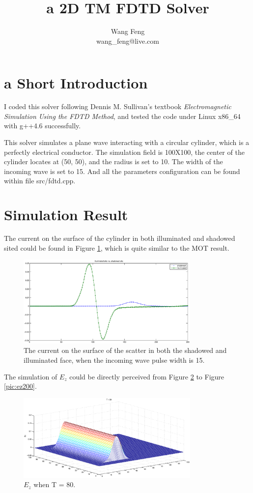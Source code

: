 \documentclass[9pt,a4paper]{article}
\author{Wang Feng \\ wang\_feng@live.com}
\title{a 2D TM FDTD Solver}
\begin{document}
\maketitle

\section{a Short Introduction}

I coded this solver following Dennis M. Sullivan's textbook \textit{Electromagnetic Simulation Using the FDTD Method}, 
and tested the code under Linux x86\_64 with g++4.6 successfully. 

This solver simulates a plane wave interacting with a circular cylinder, which is a perfectly electrical conductor.   
The simulation field is 100X100, the center of the cylinder locates at (50, 50), and the radius is set to 10. 
The width of the incoming wave is set to 15. And all the parameters configuration can be found within file src/fdtd.cpp.

\section{Simulation Result}

The current on the surface of the cylinder in both illuminated and shadowed sited could be found in Figure \ref{pic:vs}, which is quite
similar to the MOT result.


\begin{figure}
\centering
\includegraphics[angle=270,
    width=0.8\textwidth]{ill.vs.sh.eps}
\caption{The current on the surface of the scatter in both the shadowed and illuminated face, when the incoming wave pulse width is 15.}
\label{pic:vs}
\end{figure}

The simulation of $E_z$ could be directly perceived from Figure \ref{pic:ez80} to Figure \ref{pic:ez200}.


\begin{figure}
\centering
\includegraphics[angle=90,
    width=0.8\textwidth]{ez.80.eps}
\caption{$E_z$ when T = 80.}
\label{pic:ez80}
\end{figure}
\end{document}
